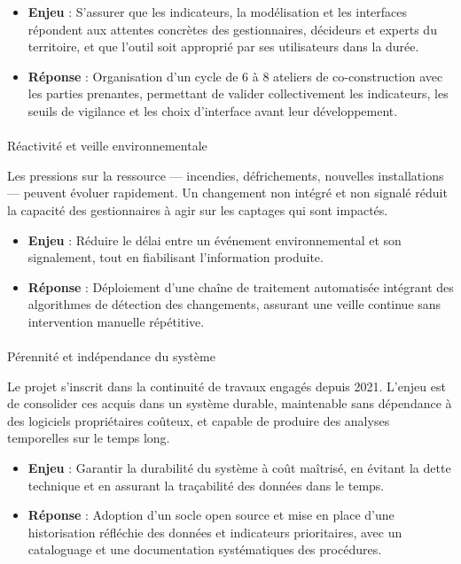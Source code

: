 \documentclass[
  11pt,
]{article}
\makeatletter
\let\oldparagraph\paragraph
\renewcommand{\paragraph}{
    \@ifstar
      \xxxParagraphStar
      \xxxParagraphNoStar
  }
\newcommand{\xxxParagraphStar}[1]{\oldparagraph*{#1}\mbox{}}
\newcommand{\xxxParagraphNoStar}[1]{\oldparagraph{#1}\mbox{}}
\providecommand{\tightlist}{%
  \setlength{\itemsep}{0pt}\setlength{\parskip}{0pt}}\usepackage{longtable,booktabs,array}
\makeatother
\begin{document}
\begin{itemize}
\tightlist
\item
  \textbf{Enjeu} : S'assurer que les indicateurs, la modélisation et les
  interfaces répondent aux attentes concrètes des gestionnaires,
  décideurs et experts du territoire, et que l'outil soit approprié par
  ses utilisateurs dans la durée.
\item
  \textbf{Réponse} : Organisation d'un cycle de 6 à 8 ateliers de
  co-construction avec les parties prenantes, permettant de valider
  collectivement les indicateurs, les seuils de vigilance et les choix
  d'interface avant leur développement.
\end{itemize}

\paragraph{Réactivité et veille
environnementale}\label{ruxe9activituxe9-et-veille-environnementale}

Les pressions sur la ressource --- incendies, défrichements, nouvelles
installations --- peuvent évoluer rapidement. Un changement non intégré
et non signalé réduit la capacité des gestionnaires à agir sur les
captages qui sont impactés.

\begin{itemize}
\tightlist
\item
  \textbf{Enjeu} : Réduire le délai entre un événement environnemental
  et son signalement, tout en fiabilisant l'information produite.
\item
  \textbf{Réponse} : Déploiement d'une chaîne de traitement automatisée
  intégrant des algorithmes de détection des changements, assurant une
  veille continue sans intervention manuelle répétitive.
\end{itemize}

\paragraph{Pérennité et indépendance du
système}\label{puxe9rennituxe9-et-induxe9pendance-du-systuxe8me}

Le projet s'inscrit dans la continuité de travaux engagés depuis 2021.
L'enjeu est de consolider ces acquis dans un système durable,
maintenable sans dépendance à des logiciels propriétaires coûteux, et
capable de produire des analyses temporelles sur le temps long.

\begin{itemize}
\tightlist
\item
  \textbf{Enjeu} : Garantir la durabilité du système à coût maîtrisé, en
  évitant la dette technique et en assurant la traçabilité des données
  dans le temps.
\item
  \textbf{Réponse} : Adoption d'un socle open source et mise en place
  d'une historisation réfléchie des données et indicateurs prioritaires,
  avec un cataloguage et une documentation systématiques des procédures.
\end{itemize}
\end{document}
